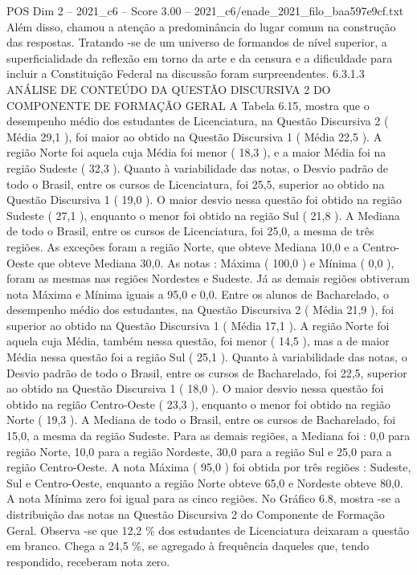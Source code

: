 \begin{textsample}{POS Dim 2 – 2021\_c6 – Score 3.00 – 2021\_c6/enade\_2021\_filo\_baa597e9cf.txt}
Além disso, chamou a atenção a predominância do lugar comum na construção das respostas.
Tratando -se de um universo de formandos de nível superior, a superficialidade da reflexão em torno da arte e da censura e a dificuldade para incluir a Constituição Federal na discussão foram surpreendentes. 6.3.1.3 ANÁLISE DE CONTEÚDO DA QUESTÃO DISCURSIVA 2 DO COMPONENTE DE FORMAÇÃO GERAL A Tabela 6.15, mostra que o desempenho médio dos estudantes de Licenciatura, na Questão Discursiva 2 ( Média 29,1 ), foi maior ao obtido na Questão Discursiva 1 ( Média 22,5 ).
A região Norte foi aquela cuja Média foi menor ( 18,3 ), e a maior Média foi na região Sudeste ( 32,3 ).
Quanto à variabilidade das notas, o Desvio padrão de todo o Brasil, entre os cursos de Licenciatura, foi 25,5, superior ao obtido na Questão Discursiva 1 ( 19,0 ).
O maior desvio nessa questão foi obtido na região Sudeste ( 27,1 ), enquanto o menor foi obtido na região Sul ( 21,8 ).
A Mediana de todo o Brasil, entre os cursos de Licenciatura, foi 25,0, a mesma de três regiões.
As exceções foram a região Norte, que obteve Mediana 10,0 e a Centro-Oeste que obteve Mediana 30,0.
As notas : Máxima ( 100,0 ) e Mínima ( 0,0 ), foram as mesmas nas regiões Nordestes e Sudeste.
Já as demais regiões obtiveram nota Máxima e Mínima iguais a 95,0 e 0,0.
Entre os alunos de Bacharelado, o desempenho médio dos estudantes, na Questão Discursiva 2 ( Média 21,9 ), foi superior ao obtido na Questão Discursiva 1 ( Média 17,1 ).
A região Norte foi aquela cuja Média, também nessa questão, foi menor ( 14,5 ), mas a de maior Média nessa questão foi a região Sul ( 25,1 ).
Quanto à variabilidade das notas, o Desvio padrão de todo o Brasil, entre os cursos de Bacharelado, foi 22,5, superior ao obtido na Questão Discursiva 1 ( 18,0 ).
O maior desvio nessa questão foi obtido na região Centro-Oeste ( 23,3 ), enquanto o menor foi obtido na região Norte ( 19,3 ).
A Mediana de todo o Brasil, entre os cursos de Bacharelado, foi 15,0, a mesma da região Sudeste.
Para as demais regiões, a Mediana foi : 0,0 para região Norte, 10,0 para a região Nordeste, 30,0 para a região Sul e 25,0 para a região Centro-Oeste.
A nota Máxima ( 95,0 ) foi obtida por três regiões : Sudeste, Sul e Centro-Oeste, enquanto a região Norte obteve 65,0 e Nordeste obteve 80,0.
A nota Mínima zero foi igual para as cinco regiões.
No Gráfico 6.8, mostra -se a distribuição das notas na Questão Discursiva 2 do Componente de Formação Geral.
Observa -se que 12,2 \% dos estudantes de Licenciatura deixaram a questão em branco.
Chega a 24,5 \%, se agregado à frequência daqueles que, tendo respondido, receberam nota zero.

\end{textsample}
